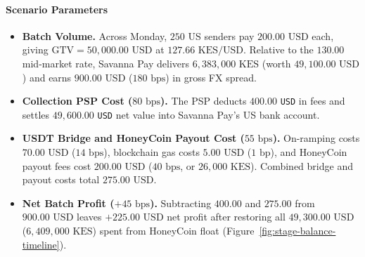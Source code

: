 \paragraph{Scenario Parameters}
\begin{itemize}
  \item \textbf{Batch Volume.} Across Monday, $250$ US senders pay $200.00\text{ USD}$ each, giving $\text{GTV} = 50{,}000.00\text{ USD}$ at $127.66\text{ KES/USD}$. Relative to the $130.00$ mid-market rate, Savanna Pay delivers $6{,}383{,}000\text{ KES}$ (worth $49{,}100.00\text{ USD}$) and earns $900.00\text{ USD}$ ($180\text{ bps}$) in gross FX spread.
  \item \textbf{Collection PSP Cost ($80\text{ bps}$).} The PSP deducts $400.00$ \texttt{USD} in fees and settles $49{,}600.00$ \texttt{USD} net value into Savanna Pay's US bank account.
  \item \textbf{USDT Bridge and HoneyCoin Payout Cost ($55\text{ bps}$).} On-ramping costs $70.00\text{ USD}$ ($14\text{ bps}$), blockchain gas costs $5.00\text{ USD}$ ($1\text{ bp}$), and HoneyCoin payout fees cost $200.00\text{ USD}$ ($40\text{ bps}$, or $26{,}000\text{ KES}$). Combined bridge and payout costs total $275.00\text{ USD}$.
  \item \textbf{Net Batch Profit ($+45\text{ bps}$).} Subtracting $400.00$ and $275.00$ from $900.00\text{ USD}$ leaves $+225.00\text{ USD}$ net profit after restoring all $49{,}300.00\text{ USD}$ ($6{,}409{,}000\text{ KES}$) spent from HoneyCoin float (Figure~\ref{fig:stage-balance-timeline}).
\end{itemize}

